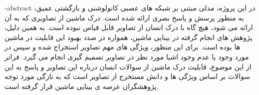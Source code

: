 
\fa-abstract{
در این پروژه، مدلی مبتنی بر شبکه های عصبی کانولوشنی و بازگشتی عمیق، به منظور پرسش و پاسخ بصری ارائه شده است. درک ماشین از تصاویری که به آن ارائه می شود، هیچ گاه با درک انسان از تصاویر قابل قیاس نبوده است. به همین دلیل، پژوهش های انجام گرفته در بینایی ماشین، همواره در صدد بهبود این قابلیت در ماشین ها بوده است. برای این منظور، ویژگی های مهم تصاویر استخراج شده و سپس در مورد وجود یا عدم وجود اشیا مورد نظر در تصاویر تصمیم گیری انجام می گیرد. فراتر از این موضوع، قابلیت درک ماشین از سوالات انسان درباره این تصاویر و پاسخ به این سوالات بر اساس ویژگی ها و دانش مستخرج از تصاویر  است که به تازگی مورد توجه پژوهشگران عرصه ی بینایی ماشین قرار گرفته است.
}





\AUTtitle
